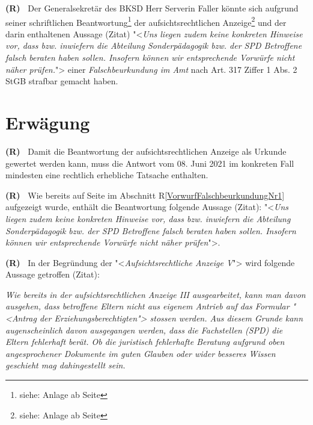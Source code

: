 \documentclass[paper=a4,fontsize=12pt, oneside, numbers=noenddot]{scrbook}
\newcounter{rz}
\newcommand{\Rz}{
	\addtocounter{rz}{1}\textbf{(R\arabic{rz})~}
}
\newcommand{\RzLabel}[1]{
	\refstepcounter{rz}\label{#1}\textbf{(R\arabic{rz})~}
}
\begin{document}
\RzLabel{VorwurfFalschbeurkundungNr1} Der Generalsekretär des BKSD Herr Serverin Faller könnte sich aufgrund seiner schriftlichen Beantwortung\footnote{siehe: Anlage ab Seite \pageref{EntscheidAnzeige}} der aufsichtsrechtlichen Anzeige\footnote{siehe: Anlage ab Seite \pageref{EmailAnhangAnzeige}} und der darin enthaltenen Aussage (Zitat) "<\textit{Uns liegen zudem keine konkreten Hinweise vor, dass bzw. inwiefern die Abteilung Sonderpädagogik bzw. der SPD Betroffene falsch beraten haben sollen. Insofern können wir entsprechende Vorwürfe nicht näher prüfen.}"> einer \textit{Falschbeurkundung im Amt} nach Art. 317 Ziffer 1 Abs. 2 StGB strafbar gemacht haben.



\section{Erwägung}

\Rz Damit die Beantwortung der aufsichtsrechtlichen Anzeige als Urkunde gewertet werden kann, muss die Antwort vom 08. Juni 2021 im konkreten Fall mindesten eine rechtlich erhebliche Tatsache enthalten. 

\Rz Wie bereits auf Seite \pageref{VorwurfFalschbeurkundungNr1} im Abschnitt R\ref{VorwurfFalschbeurkundungNr1} aufgezeigt wurde, enthält die Beantwortung folgende Aussage (Zitat): "<\textit{Uns liegen zudem keine konkreten Hinweise vor, dass bzw. inwiefern die Abteilung Sonderpädagogik bzw. der SPD Betroffene falsch beraten haben sollen. Insofern können wir entsprechende Vorwürfe nicht näher prüfen}">.

\Rz In der Begründung der "<\textit{Aufsichtsrechtliche Anzeige V}"> wird folgende Aussage getroffen (Zitat):
\begin{addmargin}[2.5em]{0em}\emph{Wie bereits in der aufsichtsrechtlichen Anzeige III ausgearbeitet, kann man davon ausgehen, dass betroffene Eltern nicht aus eigenem Antrieb auf das Formular "<Antrag der Erziehungsberechtigten"> stossen werden. Aus diesem Grunde kann augenscheinlich davon ausgegangen werden, dass die Fachstellen (SPD) die Eltern fehlerhaft berät. Ob die juristisch fehlerhafte Beratung aufgrund oben angesprochener Dokumente im guten Glauben oder wider besseres Wissen geschieht mag dahingestellt sein.
}\end{addmargin} 
\end{document}
